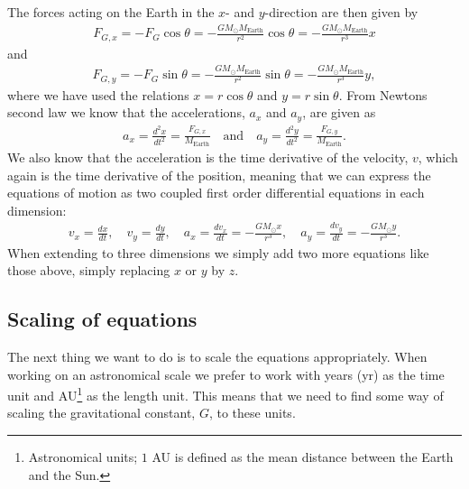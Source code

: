 \documentclass[12pt, a4paper]{article}
\begin{document}
The forces acting on the Earth in the $x$- and $y$-direction are then given by 
\begin{align*}
F_{G,x} = - F_G \cos\theta  = - \frac{GM_{\odot} M_{\text{Earth}}}{r^2}\cos\theta 
							= - \frac{GM_{\odot} M_{\text{Earth}}}{r^3}x 
\end{align*} 
and 
\begin{align*}
F_{G,y} = - F_G \sin\theta  = - \frac{GM_{\odot} M_{\text{Earth}}}{r^2}\sin\theta 
							= - \frac{GM_{\odot} M_{\text{Earth}}}{r^3}y,  
\end{align*}
where we have used the relations $x = r\cos\theta$ and $y = r\sin\theta$. From Newtons second law we know 
that the accelerations, $a_x$ and $a_y$, are given as 
\begin{align*}
a_x = \frac{d^2x}{dt^2} = \frac{F_{G,x}}{M_{\text{Earth}}} \quad \text{and} \quad 
a_y = \frac{d^2y}{dt^2} = \frac{F_{G,y}}{M_{\text{Earth}}}. 
\end{align*} 
We also know that the acceleration is the time derivative of the velocity, $v$, which again is 
the time derivative of the position, meaning that we can express the equations of motion as two 
coupled first order differential equations in each dimension:  
\begin{align}
v_x = \frac{dx}{dt}, \quad v_y = \frac{dy}{dt}, \quad 
a_x = \frac{dv_x}{dt} = -\frac{GM_{\odot}x}{r^3}, \quad a_y = \frac{dv_y}{dt} = -\frac{GM_{\odot}y}{r^3}.   
\label{eq:diff_eqs}
\end{align}
When extending to three dimensions we simply add two more equations like those above, simply 
replacing $x$ or $y$ by $z$. 

\subsection{Scaling of equations}

The next thing we want to do is to scale the equations appropriately. When working on an astronomical 
scale we prefer to work with years (yr) as the time unit and AU\footnote{Astronomical units; $1$ AU is
defined as the mean distance between the Earth and the Sun.} as the length unit. This means that we 
need to find some way of scaling the gravitational constant, $G$, to these units. 
\end{document}
